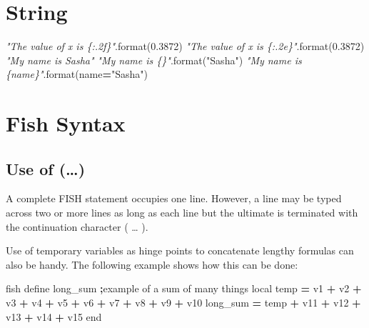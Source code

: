 \documentclass[a4paper, nobind]{templates/ociamthesis}
\newenvironment{Shaded}{\begin{snugshade}}{\end{snugshade}}
\newcommand{\BuiltInTok}[1]{#1}
\newcommand{\CommentTok}[1]{\textcolor[rgb]{0.56,0.35,0.01}{\textit{#1}}}
\newcommand{\FloatTok}[1]{\textcolor[rgb]{0.00,0.00,0.81}{#1}}
\newcommand{\NormalTok}[1]{#1}
\newcommand{\OperatorTok}[1]{\textcolor[rgb]{0.81,0.36,0.00}{\textbf{#1}}}
\newcommand{\StringTok}[1]{\textcolor[rgb]{0.31,0.60,0.02}{#1}}
\renewenvironment{Shaded}
{
  \vspace{10pt}%
  \begin{snugshade}%
}{%
  \end{snugshade}%
  \vspace{8pt}%
}
\begin{document}
\hypertarget{string}{%
\section{String}\label{string}}

\begin{Shaded}
\begin{Highlighting}[]
\CommentTok{"The value of x is \{:.2f\}"}\NormalTok{.}\BuiltInTok{format}\NormalTok{(}\FloatTok{0.3872}\NormalTok{)}
\CommentTok{"The value of x is \{:.2e\}"}\NormalTok{.}\BuiltInTok{format}\NormalTok{(}\FloatTok{0.3872}\NormalTok{)}
\CommentTok{"My name is Sasha"}
\CommentTok{"My name is \{\}"}\NormalTok{.}\BuiltInTok{format}\NormalTok{(}\StringTok{"Sasha"}\NormalTok{)}
\CommentTok{"My name is \{name\}"}\NormalTok{.}\BuiltInTok{format}\NormalTok{(name}\OperatorTok{=}\StringTok{"Sasha"}\NormalTok{)}
\end{Highlighting}
\end{Shaded}

\hypertarget{fish-syntax}{%
\section{Fish Syntax}\label{fish-syntax}}

\hypertarget{use-of}{%
\subsection{Use of (\ldots)}\label{use-of}}

A complete FISH statement occupies one line. However, a line may be
typed across two or more lines as long as each line but the ultimate is terminated with the continuation character ( \ldots{} ).

Use of temporary variables as hinge points to concatenate lengthy formulas can also be handy. The following example shows how this can be done:

\begin{Shaded}
\begin{Highlighting}[]
\NormalTok{fish define long\_sum  }\OperatorTok{;}\NormalTok{example of a }\BuiltInTok{sum}\NormalTok{ of many things}
\NormalTok{    local temp }\OperatorTok{=}\NormalTok{ v1 }\OperatorTok{+}\NormalTok{ v2 }\OperatorTok{+}\NormalTok{ v3 }\OperatorTok{+}\NormalTok{ v4 }\OperatorTok{+}\NormalTok{ v5 }\OperatorTok{+}\NormalTok{ v6 }\OperatorTok{+}\NormalTok{ v7 }\OperatorTok{+}\NormalTok{ v8 }\OperatorTok{+}\NormalTok{ v9 }\OperatorTok{+}\NormalTok{ v10}
\NormalTok{    long\_sum }\OperatorTok{=}\NormalTok{ temp }\OperatorTok{+}\NormalTok{ v11 }\OperatorTok{+}\NormalTok{ v12 }\OperatorTok{+}\NormalTok{ v13 }\OperatorTok{+}\NormalTok{ v14 }\OperatorTok{+}\NormalTok{ v15}
\NormalTok{end}
\end{Highlighting}
\end{Shaded}
\end{document}
